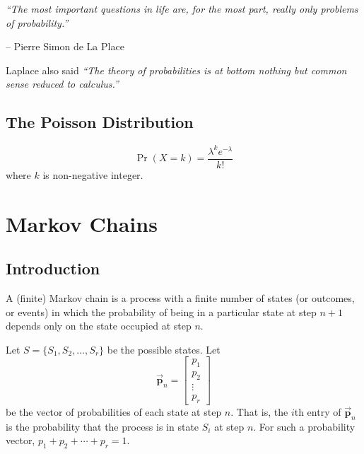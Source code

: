 \documentclass[reqno]{immbook}
\newcommand{\BP}{\vec{\textbf{p}}}
\numberwithin{equation}{chapter}
\numberwithin{question}{section}
\numberwithin{theorem}{chapter}
\numberwithin{figure}{chapter}
\theoremstyle{definition}
\begin{document}
\emph{``The most important questions in life are, for the 
       most part, really only problems of probability.''}


\hfill            -- Pierre Simon de La Place

\bigskip
Laplace also said \emph{``The theory of probabilities is at bottom nothing but common sense 
      reduced to calculus.''}


\section{The Poisson Distribution}
\begin{equation}
  \Pr(X=k) = \frac{\lambda^k e^{-\lambda}}{k!}
\end{equation}
where $k$ is non-negative integer.



\chapter{Markov Chains}

\section{Introduction}
A (finite) Markov chain is a process with a finite
number of states (or outcomes, or events) in which
the probability of being in a particular state
at step $n+1$ depends only on the state occupied
at step $n$.

Let $S = \{S_1,S_2,\ldots,S_r\}$ be the possible states.
Let
\begin{equation}
   \BP_n = \begin{bmatrix}
               p_1 \\ p_2 \\ \vdots \\ p_r
           \end{bmatrix}
\end{equation}
be the vector  of probabilities of each state
at step $n$. That is, the $i$th entry of $\BP_n$
is the probability that the process is in
state $S_i$ at step $n$.
For such a probability vector, $p_1+p_2+\cdots+p_r = 1$.
\end{document}
